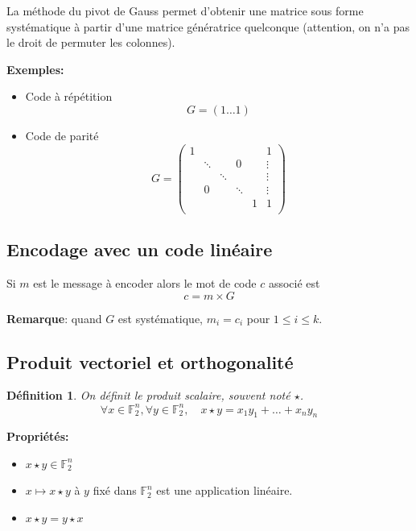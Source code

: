 \documentclass[a4paper,10pt,twocolumn]{article}
\theoremstyle{break}
\newtheorem{mydef}{Définition}
\newenvironment{note}[1]
{\textbf{#1}:}
{}
\newenvironment{remarque}
{\begin{note}{Remarque}}
{\end{note}}
\begin{document}
La méthode du pivot de Gauss permet d'obtenir une matrice sous forme systématique à partir d'une matrice génératrice quelconque (attention, on n'a pas le droit de permuter les colonnes).

\textbf{Exemples:}
\begin{itemize}
 \item Code à répétition
 $$ G = (1 \ldots 1) $$
 \item Code de parité
 $$ G = \left(
\begin{array}{cccccc}
 1 & & & & & 1 \\
 & \ddots & & 0 & & \vdots \\
 & & \ddots & & & \vdots \\
 & 0 & & \ddots & & \vdots \\
 & & & & 1 & 1\\
\end{array}
\right)$$

\end{itemize}

\subsection{Encodage avec un code linéaire}
Si $m$ est le message à encoder alors le mot de code $c$ associé est 
$$c = m \times G$$

\begin{remarque}
 quand $G$ est systématique, $m_i = c_i$ pour $1 \le i \le k$.
\end{remarque}

\subsection{Produit vectoriel et orthogonalité}

\begin{mydef}
 On définit le produit scalaire, souvent noté $\star$.
 $$ \forall x \in \mathbb{F}_2^n, \forall y \in \mathbb{F}_2^n, \quad x \star y = x_1y_1 + \ldots + x_ny_n $$
\end{mydef}

\textbf{Propriétés:}
\begin{itemize}
 \item $x \star y \in \mathbb{F}_2^n$
 \item $x \mapsto x \star y$ à $y$ fixé dans $\mathbb{F}_2^n$ est une application linéaire.
 \item $x \star y = y \star x$
\end{itemize}
\end{document}
